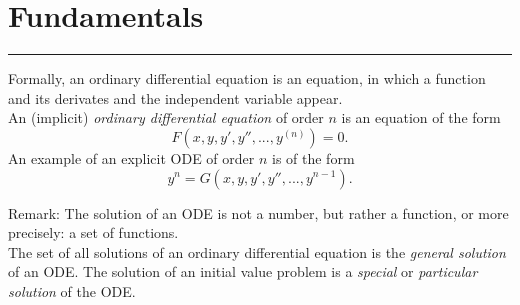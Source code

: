 \section{Fundamentals}
\noindent\rule[\linienAbstand]{\linewidth}{\linienDickeDick}
Formally, an ordinary differential equation is an equation, in which a function and its derivates and the independent variable appear.\\

An (implicit) \emph{ordinary differential equation} of order $n$ is an equation of the form
\begin{equation}
  F(x, y, y', y'', ..., y^{(n)}) = 0.
\end{equation}
An example of an explicit ODE of order $n$ is of the form
\begin{equation}
  y^{n} = G(x, y, y', y'', ..., y^{n-1}).
\end{equation}

Remark: The solution of an ODE is not a number, but rather a function, or more precisely: a set of functions.\\
The set of all solutions of an ordinary differential equation is the \emph{general solution} of an ODE. The solution of an initial value problem is a \emph{special} or \emph{particular solution} of the ODE.
